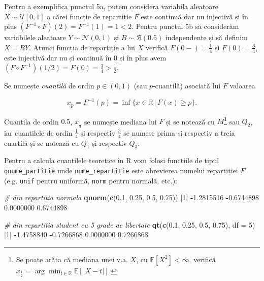 \documentclass[]{article}
\newenvironment{Shaded}{\begin{snugshade}}{\end{snugshade}}
\newcommand{\KeywordTok}[1]{\textcolor[rgb]{0.13,0.29,0.53}{\textbf{#1}}}
\newcommand{\DataTypeTok}[1]{\textcolor[rgb]{0.13,0.29,0.53}{#1}}
\newcommand{\DecValTok}[1]{\textcolor[rgb]{0.00,0.00,0.81}{#1}}
\newcommand{\FloatTok}[1]{\textcolor[rgb]{0.00,0.00,0.81}{#1}}
\newcommand{\CommentTok}[1]{\textcolor[rgb]{0.56,0.35,0.01}{\textit{#1}}}
\newcommand{\OperatorTok}[1]{\textcolor[rgb]{0.81,0.36,0.00}{\textbf{#1}}}
\newcommand{\NormalTok}[1]{#1}
\let\rmarkdownfootnote\footnote%
\def\footnote{\protect\rmarkdownfootnote}
\begin{document}
Pentru a exemplifica punctul 5a, putem considera variabila aleatoare
\(X\sim\mathcal{U}[0,1]\) a cărei funcție de repartiție \(F\) este
continuă dar nu injectivă și în plus
\((F^{-1}\circ F)(2) = F^{-1}(1) = 1 < 2\). Pentru punctul 5b să
considerăm variabilele aleatoare \(Y\sim\mathcal{N}(0,1)\) și
\(B\sim\mathcal{B}(0.5)\) independente și să definim \(X = BY\). Atunci
funcția de repartiție a lui \(X\) verifică \(F(0-) = \frac{1}{4}\) și
\(F(0) = \frac{3}{4}\), este injectivă dar nu și continuă în \(0\) și în
plus avem \((F\circ F^{-1})(1/2) = F(0) = \frac{3}{4}>\frac{1}{2}\).

Se numește \emph{cuantilă} de ordin \(p\in(0,1)\) (sau \(p\)-cuantilă)
asociată lui \(F\) valoarea

\[
  x_p = F^{-1}(p) = \inf\{x\in\mathbb{R}\,|\,F(x)\geq p\}.
\]

Cuantila de ordin \(0.5\), \(x_{\frac{1}{2}}\) se numește mediana lui
\(F\) și se notează cu \(M\)\footnote{Se poate arăta că mediana unei
  v.a. \(X\), cu \(\mathbb{E}[X^2]<\infty\), verifică
  \(x_{\frac{1}{2}} = \arg\min_{t\in\mathbb{R}}\mathbb{E}[|X-t|]\).} sau
\(Q_2\), iar cuantilele de ordin \(\frac{1}{4}\) și respectiv
\(\frac{3}{4}\) se numesc prima și respectiv a treia cuartilă și se
notează cu \(Q_1\) și respectiv \(Q_3\).

Pentru a calcula cuantilele teoretice în R vom folosi funcțiile de tipul
\texttt{qnume\_partiție} unde \texttt{nume\_repartiție} este abrevierea
numelui repartiției \(F\) (e.g. \texttt{unif} pentru uniformă,
\texttt{norm} pentru normală, etc.):

\begin{Shaded}
\begin{Highlighting}[]
\CommentTok{# din repartitia normala}
\KeywordTok{qnorm}\NormalTok{(}\KeywordTok{c}\NormalTok{(}\FloatTok{0.1}\NormalTok{, }\FloatTok{0.25}\NormalTok{, }\FloatTok{0.5}\NormalTok{, }\FloatTok{0.75}\NormalTok{))}
\NormalTok{[}\DecValTok{1}\NormalTok{] }\OperatorTok{-}\FloatTok{1.2815516} \OperatorTok{-}\FloatTok{0.6744898}  \FloatTok{0.0000000}  \FloatTok{0.6744898}

\CommentTok{# din repartitia student cu 5 grade de libertate}
\KeywordTok{qt}\NormalTok{(}\KeywordTok{c}\NormalTok{(}\FloatTok{0.1}\NormalTok{, }\FloatTok{0.25}\NormalTok{, }\FloatTok{0.5}\NormalTok{, }\FloatTok{0.75}\NormalTok{), }\DataTypeTok{df =} \DecValTok{5}\NormalTok{)}
\NormalTok{[}\DecValTok{1}\NormalTok{] }\OperatorTok{-}\FloatTok{1.4758840} \OperatorTok{-}\FloatTok{0.7266868}  \FloatTok{0.0000000}  \FloatTok{0.7266868}
\end{Highlighting}
\end{Shaded}
\end{document}
